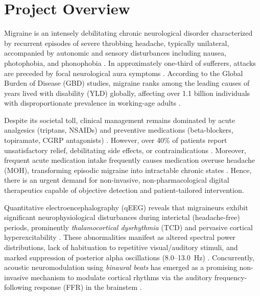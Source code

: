 \documentclass[12pt, a4paper]{report}
\begin{document}
\section{Project Overview}
\label{sec:project_overview}
Migraine is an intensely debilitating chronic neurological disorder characterized by recurrent episodes of severe throbbing headache, typically unilateral, accompanied by autonomic and sensory disturbances including nausea, photophobia, and phonophobia \cite{Zhang2023,VanDenHoek2024}. In approximately one-third of sufferers, attacks are preceded by focal neurological aura symptoms \cite{Riederer2023}. According to the Global Burden of Disease (GBD) studies, migraine ranks among the leading causes of years lived with disability (YLD) globally, affecting over 1.1 billion individuals with disproportionate prevalence in working-age adults \cite{Petrusic2025,DanelakisStubberud2025}.

Despite its societal toll, clinical management remains dominated by acute analgesics (triptans, NSAIDs) and preventive medications (beta-blockers, topiramate, CGRP antagonists) \cite{Quartetti2025,Shamsi2024}. However, over 40\% of patients report unsatisfactory relief, debilitating side effects, or contraindications \cite{Shamsi2024}. Moreover, frequent acute medication intake frequently causes medication overuse headache (MOH), transforming episodic migraine into intractable chronic states \cite{GomezPilar2022}. Hence, there is an urgent demand for non-invasive, non-pharmacological digital therapeutics capable of objective detection and patient-tailored intervention.

Quantitative electroencephalography (qEEG) reveals that migraineurs exhibit significant neurophysiological disturbances during interictal (headache-free) periods, prominently \textit{thalamocortical dysrhythmia} (TCD) and pervasive cortical hyperexcitability \cite{VanDenHoek2024,AbdulhusseinAldeen2024}. These abnormalities manifest as altered spectral power distributions, lack of habituation to repetitive visual/auditory stimuli, and marked suppression of posterior alpha oscillations (8.0--13.0~Hz) \cite{chamanzar2021uhd,Zhang2023,FrimpongManson2024}. Concurrently, acoustic neuromodulation using \textit{binaural beats} has emerged as a promising non-invasive mechanism to modulate cortical rhythms via the auditory frequency-following response (FFR) in the brainstem \cite{Oster1973,Wahbeh2007,Ingendoh2023}.
\end{document}
